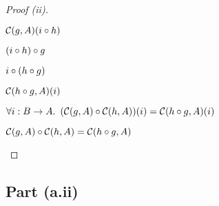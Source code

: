 \begin{prop}
\begin{proof}[Proof (ii)]
\begin{itemize}
\begin{itemize}
          \step[=] $\mathcal{C}(g, A)(i\circ h)$
            \marginnote{\Def-\ref{def:contra-hom}}

          \step[=] $(i\circ h)\circ g$
            \marginnote{\Def-\ref{def:contra-hom}}

          \step[=] $i\circ (h\circ g)$
            \marginnote{\Assoc-$\compose$}

          \step[=] $\mathcal{C}(h\circ g, A)(i)$
            \marginnote{\Def-\ref{def:contra-hom}}
        \end{itemize}

      \step[\imps]
        $\forall i : B\to A\ldotp~(\mathcal{C}(g, A)\circ\mathcal{C}(h, A))(i) = \mathcal{C}(h\circ g, A)(i)$
        \marginnote{$\forall$-\Intro}

      \step[\iffs]
        $\mathcal{C}(g, A)\circ\mathcal{C}(h, A) = \mathcal{C}(h\circ g, A)$
        \marginnote{\Def-$=$}
        \qedhere
    \end{itemize}
  \end{proof}
\end{prop}

\subsection{Part (a.ii)}\label{sec:q-1-a-ii}

